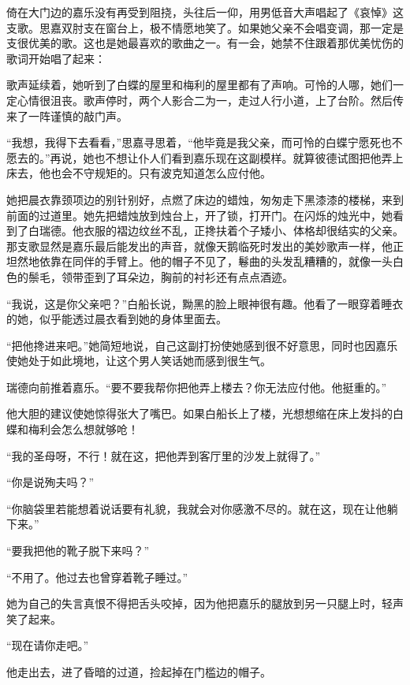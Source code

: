 \par 倚在大门边的嘉乐没有再受到阻挠，头往后一仰，用男低音大声唱起了《哀悼》这支歌。思嘉双肘支在窗台上，极不情愿地笑了。如果她父亲不会唱变调，那一定是支很优美的歌。这也是她最喜欢的歌曲之一。有一会，她禁不住跟着那优美忧伤的歌词开始唱了起来：
\par 歌声延续着，她听到了白蝶的屋里和梅利的屋里都有了声响。可怜的人哪，她们一定心情很沮丧。歌声停时，两个人影合二为一，走过人行小道，上了台阶。然后传来了一阵谨慎的敲门声。
\par “我想，我得下去看看，”思嘉寻思着，“他毕竟是我父亲，而可怜的白蝶宁愿死也不愿去的。”再说，她也不想让仆人们看到嘉乐现在这副模样。就算彼德试图把他弄上床去，他也会不守规矩的。只有波克知道怎么应付他。
\par 她把晨衣靠颈项边的别针别好，点燃了床边的蜡烛，匆匆走下黑漆漆的楼梯，来到前面的过道里。她先把蜡烛放到烛台上，开了锁，打开门。在闪烁的烛光中，她看到了白瑞德。他衣服的褶边纹丝不乱，正搀扶着个子矮小、体格却很结实的父亲。那支歌显然是嘉乐最后能发出的声音，就像天鹅临死时发出的美妙歌声一样，他正坦然地依靠在同伴的手臂上。他的帽子不见了，鬈曲的头发乱糟糟的，就像一头白色的鬃毛，领带歪到了耳朵边，胸前的衬衫还有点点酒迹。
\par “我说，这是你父亲吧？”白船长说，黝黑的脸上眼神很有趣。他看了一眼穿着睡衣的她，似乎能透过晨衣看到她的身体里面去。
\par “把他搀进来吧。”她简短地说，自己这副打扮使她感到很不好意思，同时也因嘉乐使她处于如此境地，让这个男人笑话她而感到很生气。
\par 瑞德向前推着嘉乐。“要不要我帮你把他弄上楼去？你无法应付他。他挺重的。”
\par 他大胆的建议使她惊得张大了嘴巴。如果白船长上了楼，光想想缩在床上发抖的白蝶和梅利会怎么想就够呛！
\par “我的圣母呀，不行！就在这，把他弄到客厅里的沙发上就得了。”
\par “你是说殉夫吗？”
\par “你脑袋里若能想着说话要有礼貌，我就会对你感激不尽的。就在这，现在让他躺下来。”
\par “要我把他的靴子脱下来吗？”
\par “不用了。他过去也曾穿着靴子睡过。”
\par 她为自己的失言真恨不得把舌头咬掉，因为他把嘉乐的腿放到另一只腿上时，轻声笑了起来。
\par “现在请你走吧。”
\par 他走出去，进了昏暗的过道，捡起掉在门槛边的帽子。
